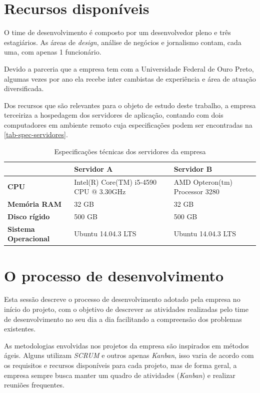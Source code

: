 \documentclass[
12pt,				%
openright,			%
oneside,			%
a4paper,			%
english,			%
french,				%
spanish,			%
brazil,				%
]{abntex2}
\begin{document}
\section{Recursos disponíveis}

O time de desenvolvimento é composto por um desenvolvedor pleno e três estagiários. As áreas de \textit{design}, análise de negócios e jornalismo contam, cada uma, com apenas 1 funcionário.

Devido a parceria que a empresa tem com a Universidade Federal de Ouro Preto, algumas vezes por ano ela recebe inter cambistas de experiência e área de atuação diversificada.

Dos recursos que são relevantes para o objeto de estudo deste trabalho, a empresa terceiriza a hospedagem dos servidores de aplicação, contando com dois computadores em ambiente remoto cuja especificações podem ser encontradas na \autoref{tab-spec-servidores}.

\begin{table}[htb]
	\caption{Especificações técnicas dos servidores da empresa}
	
	\label{tab-spec-servidores}	
	\begin{tabular}{p{3.85cm}|p{5.20cm}|p{5.20cm}}
		& \textbf{Servidor A} & \textbf{Servidor B}  \\
		\hline
		\textbf{CPU} & Intel(R) Core(TM) i5-4590 CPU @ 3.30GHz & AMD Opteron(tm) Processor 3280 \\
		\hline
		\textbf{Memória RAM} & 32 GB & 32 GB \\
		\hline
		\textbf{Disco rígido} & 500 GB & 500 GB \\
		\hline
		\textbf{Sistema Operacional} & Ubuntu 14.04.3 LTS & Ubuntu 14.04.3 LTS \\
	\end{tabular}
\end{table}

\section{O processo de desenvolvimento} 

Esta sessão descreve o processo de desenvolvimento adotado pela empresa no início do projeto, com o objetivo de descrever as atividades realizadas pelo time de desenvolvimento no seu dia a dia facilitando a compreensão dos problemas existentes.

As metodologias envolvidas nos projetos da empresa são inspirados em métodos ágeis. Alguns utilizam \textit{SCRUM} e outros apenas \textit{Kanban}, isso varia de acordo com os requisitos e recursos disponíveis para cada projeto, mas de forma geral, a empresa sempre busca manter um quadro de atividades (\textit{Kanban}) e realizar reuniões frequentes.
\end{document}
